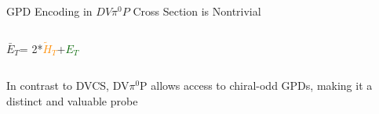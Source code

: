 \documentclass[aspectratio=169]{beamer}
\newcommand{\GPDET}{\textcolor{darkgreen}{$E_T$}}
\newcommand{\GPDHTtilde}{\textcolor{darkorange}{$\tilde{H}_T$}}
\newcommand{\GPDETbar}{\textcolor{mypurp}{$\bar{E}_T$}}
\begin{document}
\begin{frame}{GPD Encoding in  $DV\pi^0P$ Cross Section is Nontrivial}
\begin{columns}
            
                    
                \vspace{0.1cm}
                \footnotesize{\GPDETbar = 2*\GPDHTtilde+\GPDET\\}
            
        \end{columns}
    
    \vspace{0.2cm}
    
    
     \begin{columns}
            \centering
            In contrast to DVCS, DV$\pi^0$P allows access to chiral-odd GPDs, making it a distinct and valuable probe
               
    \end{columns}
               
               \vspace{0.1cm}



\end{frame}
\end{document}
